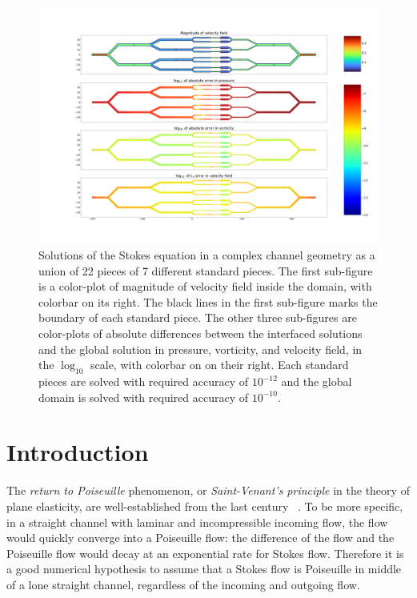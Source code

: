 \documentclass[10pt,twocolumn,letterpaper]{article}
\begin{document}
\begin{figure}[t]
  \centering
  \includegraphics[width=\textwidth]{pic/connection-error-rough.png}
  \caption{
    Solutions of the Stokes equation in a complex channel geometry 
    as a union of 22 pieces of 7 different standard pieces.
    The first sub-figure is a color-plot of magnitude of velocity field 
    inside the domain, 
    with colorbar on its right. 
    The black lines in the first sub-figure marks the boundary of each standard piece.
    The other three sub-figures are color-plots of absolute differences
    between the interfaced solutions and the global solution in pressure,
    vorticity, and velocity field, 
    in the $\log_{10}$ scale, 
    with colorbar on on their right. 
    Each standard pieces are solved with required accuracy of $10^{-12}$ 
    and the global domain is solved with required accuracy of $10^{-10}$.}\label{fig:connection-error}
\end{figure}

\section{Introduction}

The \textit{return to Poiseuille} phenomenon, 
or \textit{Saint-Venant's principle} in the theory of plane elasticity, 
are well-established from the last century
~\cite{coRecentDevelopmentsConcerning1983,gregoryTractionBoundaryValue1980,horganDECAYESTIMATESBIHARMONIC1989}.
To be more specific, 
in a straight channel with laminar and incompressible incoming flow, 
the flow would quickly converge into a Poiseuille flow: 
the difference of the flow and the Poiseuille flow would 
decay at an exponential rate for Stokes flow. 
Therefore it is a good numerical hypothesis to assume that 
a Stokes flow is Poiseuille in middle of a lone straight channel, 
regardless of the incoming and outgoing flow.
\end{document}
